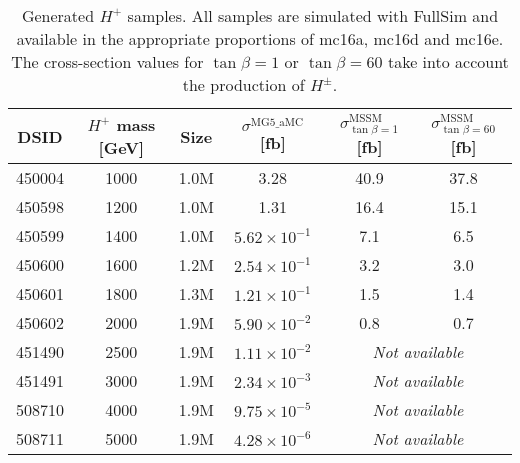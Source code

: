 \begin{table}[H]
  \centering
  \begin{tabular*}{160mm}{@{\extracolsep{\fill}}cccccc}
    \hline\hline
    DSID   & $H^{+}$ mass [GeV] & Size & ${\sigma}^{\text{MG5\_aMC}}$ [fb] & ${\sigma}_{\tan{\beta}=1}^{\text{MSSM}}$ [fb] & ${\sigma}_{\tan{\beta}=60}^{\text{MSSM}}$ [fb]\\
    \hline
    450004 & 1000 & 1.0M & 3.28                  & 40.9 & 37.8\\
    450598 & 1200 & 1.0M & 1.31                  & 16.4 & 15.1\\
    450599 & 1400 & 1.0M & $5.62{\times}10^{-1}$ &  7.1 &  6.5\\
    450600 & 1600 & 1.2M & $2.54{\times}10^{-1}$ &  3.2 &  3.0\\
    450601 & 1800 & 1.3M & $1.21{\times}10^{-1}$ &  1.5 &  1.4\\
    450602 & 2000 & 1.9M & $5.90{\times}10^{-2}$ &  0.8 &  0.7\\
    451490 & 2500 & 1.9M & $1.11{\times}10^{-2}$ & \multicolumn{2}{c}{\textit{Not available}}\\
    451491 & 3000 & 1.9M & $2.34{\times}10^{-3}$ & \multicolumn{2}{c}{\textit{Not available}}\\     
    508710 & 4000 & 1.9M & $9.75{\times}10^{-5}$ & \multicolumn{2}{c}{\textit{Not available}}\\     
    508711 & 5000 & 1.9M & $4.28{\times}10^{-6}$ & \multicolumn{2}{c}{\textit{Not available}}\\     
    \hline\hline
  \end{tabular*}
  \caption{Generated $H^{+}$ samples. All samples are simulated with FullSim and available in the appropriate proportions of mc16a, mc16d and mc16e. The cross-section values for $\tan{\beta}=1$ or $\tan{\beta}=60$ take into account the production of $H^{\pm}$.}
  \label{tab:SignalSamples}
\end{table}


